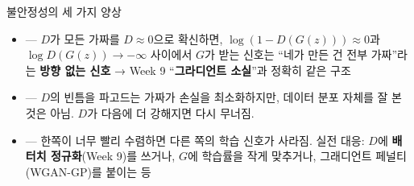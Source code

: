\begin{frame}{불안정성의 세 가지 양상}
  \begin{itemize}
    \item {} —
      $D$가 모든 가짜를 $D \approx 0$으로 확신하면, $\log(1 - D(G(z)))
      \approx 0$과 $\log D(G(z)) \to -\infty$ 사이에서 $G$가 받는
      신호는 ``네가 만든 건 전부 가짜''라는 \textbf{방향 없는 신호}
      → Week 9 ``\textbf{그라디언트 소실}''과 정확히 같은 구조
    \item {} — $D$의 빈틈을 파고드는 가짜가 손실을 최소화하지만,
      데이터 분포 자체를 잘 본 것은 아님. $D$가 다음에 더 강해지면
      다시 무너짐.
    \item {} — 한쪽이
      너무 빨리 수렴하면 다른 쪽의 학습 신호가 사라짐. 실전 대응:
      $D$에 \textbf{배터치 정규화}(Week 9)를 쓰거나, $G$에 학습률을
      작게 맞추거나, 그래디언트 페널티(WGAN-GP)를 붙이는 등
  \end{itemize}
\end{frame}
